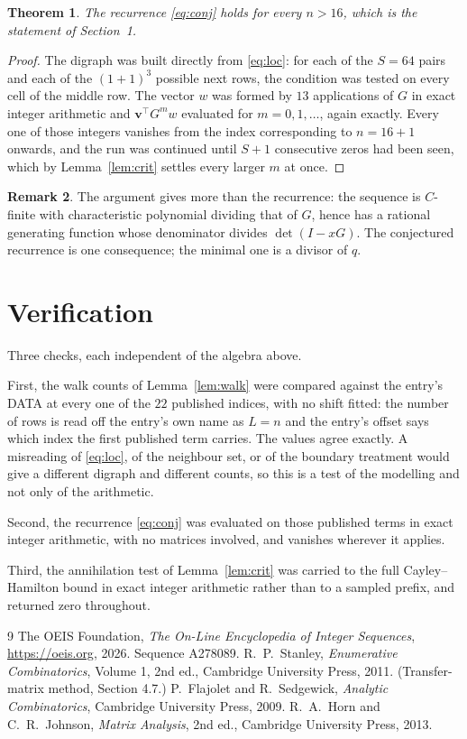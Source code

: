 \documentclass[11pt,a4paper]{article}
\theoremstyle{plain}
\newtheorem{theorem}{Theorem}
\theoremstyle{definition}
\newtheorem{remark}[theorem]{Remark}
\begin{document}
\begin{theorem}
The recurrence \eqref{eq:conj} holds for every $n>16$, which is the statement of
Section~1.
\end{theorem}

\begin{proof}
The digraph was built directly from \eqref{eq:loc}: for each of the $S=64$ pairs and each
of the $(1+1)^{3}$ possible next rows, the condition was tested on every cell of
the middle row. The vector $w$ was formed by $13$ applications of $G$ in exact integer
arithmetic and $\mathbf{v}^{\!\top}G^{m}w$ evaluated for $m=0,1,\dots$, again exactly.
Every one of those integers vanishes from the index corresponding to $n=16+1$ onwards,
and the run was continued until $S+1$ consecutive zeros had been seen, which by
Lemma~\ref{lem:crit} settles every larger $m$ at once.
\end{proof}

\begin{remark}
The argument gives more than the recurrence: the sequence is $C$-finite with characteristic
polynomial dividing that of $G$, hence has a rational generating function whose denominator
divides $\det(I-xG)$. The conjectured recurrence is one consequence; the minimal one is a
divisor of $q$.
\end{remark}

\section{Verification}

Three checks, each independent of the algebra above.

First, the walk counts of Lemma~\ref{lem:walk} were compared against the entry's DATA at
every one of the $22$ published indices, with no shift fitted: the number of rows is
read off the entry's own name as $L=n$ and the entry's offset says which index the first
published term carries. The values agree exactly. A misreading of \eqref{eq:loc}, of the
neighbour set, or of the boundary treatment would give a different digraph and different
counts, so this is a test of the modelling and not only of the arithmetic.

Second, the recurrence \eqref{eq:conj} was evaluated on those published terms in exact
integer arithmetic, with no matrices involved, and vanishes wherever it applies.

Third, the annihilation test of Lemma~\ref{lem:crit} was carried to the full
Cayley--Hamilton bound in exact integer arithmetic rather than to a sampled prefix, and
returned zero throughout.

\begin{thebibliography}{9}
 The OEIS Foundation, \emph{The On-Line Encyclopedia of Integer
Sequences}, \url{https://oeis.org}, 2026. Sequence A278089.
 R.~P.~Stanley, \emph{Enumerative Combinatorics}, Volume 1, 2nd ed.,
Cambridge University Press, 2011. (Transfer-matrix method, Section 4.7.)
 P.~Flajolet and R.~Sedgewick, \emph{Analytic Combinatorics}, Cambridge
University Press, 2009.
 R.~A.~Horn and C.~R.~Johnson, \emph{Matrix Analysis}, 2nd ed., Cambridge
University Press, 2013.
\end{thebibliography}
\end{document}
